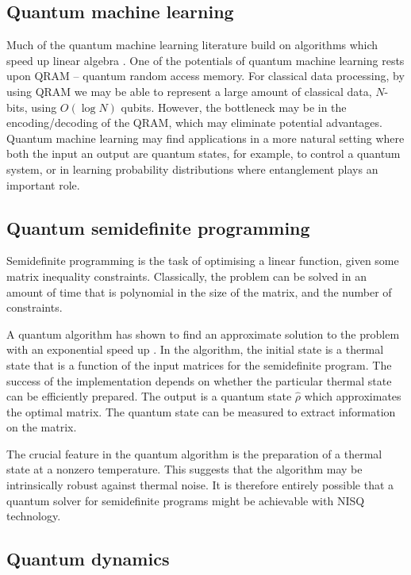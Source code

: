 \subsection{Quantum machine learning}

Much of the quantum machine learning literature build on algorithms which speed up linear algebra \cite{bib:biamonte2017quantum}. One of the potentials of quantum machine learning rests upon QRAM -- quantum random access memory. For classical data processing, by using QRAM we may be able to represent a large amount of classical data, $N$-bits, using $O(\log N)$ qubits. However, the bottleneck may be in the encoding/decoding of the QRAM, which may eliminate potential advantages. Quantum machine learning may find applications in a more natural setting where both the input an output are quantum states, for example, to control a quantum system, or in learning probability distributions where entanglement plays an important role.

\subsection{Quantum semidefinite programming}

Semidefinite programming is the task of optimising a linear function, given some matrix inequality constraints. Classically, the problem can be solved in an amount of time that is polynomial in the size of the matrix, and the number of constraints.

A quantum algorithm has shown to find an approximate solution to the problem with an exponential speed up \cite{bib:brandao2017quantum, bib:brandao2017exponential}. In the algorithm, the initial state is a thermal state that is a function of the input matrices for the semidefinite program. The success of the implementation depends on whether the particular thermal state can be efficiently prepared. The output is a quantum state $\hat\rho$ which approximates the optimal matrix. The quantum state can be measured to extract information on the matrix. 

The crucial feature in the quantum algorithm is the preparation of a thermal state at a nonzero temperature. This suggests that the algorithm may be intrinsically robust against thermal noise. It is therefore entirely possible that a quantum solver for semidefinite programs might be achievable with NISQ technology.

\subsection{Quantum dynamics}

